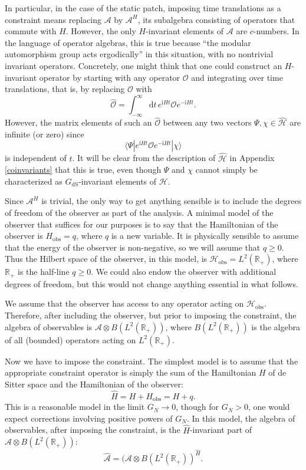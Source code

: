 \documentclass[11pt,a4paper]{article}
\def\be{\begin{equation}}
\def\ee{\end{equation}}
\def\h{\widehat}
\def\O{{\mathcal O}}
\def\A{{\mathcal A}}
\def\d{{\mathrm d}}
\def\R{{\mathbb R}}
\def\h{\widehat}
\def\H{{\mathcal H}}
\def\dS{{\mathrm{dS}}}
\def\la{\langle}
\def\ra{\rangle}
\def\obs{{\mathrm{obs}}}
\def\i{{\mathrm i}}
\begin{document}
In particular, in the case of the static patch, imposing  time translations as a constraint means replacing  $\A$ by $\A^H$, its subalgebra 
consisting of operators that commute with   $H$.    However, the only $H$-invariant elements of $\A$ are $c$-numbers.   
In the language of operator algebras, this is true because ``the modular automorphism group acts ergodically'' in this situation, with no nontrivial invariant operators.
Concretely, one 
might think that one could construct an $H$-invariant operator by starting with any operator $\O$ and integrating over time translations, that is, by replacing $\O$ with
\be\label{nbd}\h\O=\int_{-\infty}^\infty \d t \,e^{\i H t}\O e^{-\i H t}. \ee
However, the matrix elements of such an $\h\O$ between any two vectors $\Psi,\chi\in\h \H$ are infinite (or zero) since
\be\label{wnd} \la \Psi|e^{\i H t}\O e^{-\i H t}|\chi\ra\ee
is independent of $t$.    It will be clear from the description of $\h\H$ in Appendix \ref{coinvariants} that this is true, even though $\Psi$ and $\chi$ cannot
simply be characterized as $G_\dS$-invariant  elements of $\H$.

Since $\A^H$ is trivial, the only way to get anything sensible is to include the degrees of freedom of the observer as part of the analysis.   A minimal model of
the observer that suffices for our purposes is to say that the Hamiltonian of the observer is $H_\obs=q$, where $q$ is a new variable.   It is physically sensible to 
assume that the energy of the observer is non-negative, so we will assume that $q\geq 0$.   Thus the Hilbert space of the observer, in this model, is
$\H_\obs=L^2(\R_+)$, where $\R_+$ is the half-line $q\geq 0$.   We could also endow the observer with additional degrees of freedom,  but this would not change
anything essential in what follows.

We assume that the observer has access to any operator acting on $\H_\obs$.    Therefore, after including the observer, but prior to imposing the constraint, 
the algebra of observables is $\A\otimes B(L^2(\R_+))$, where $B(L^2(\R_+))$ is the algebra of all (bounded) operators acting on $L^2(\R_+)$.    

Now we have to impose the constraint.   The simplest model is to assume that the appropriate constraint operator is simply the sum of the Hamiltonian
$H$ of de Sitter space and the Hamiltonian of the observer:
\be\label{hsum}\h H =H+H_\obs=H+q. \ee
This is a reasonable model in the limit $G_N\to 0$, though for $G_N>0$, one would expect corrections involving positive powers of $G_N$.   
In this model, the algebra of observables, after imposing the constraint, is the $\h H$-invariant part of $\A\otimes B(L^2(\R_+))$:
\be\label{tsum}\h \A =(\A\otimes B(L^2(\R_+))^{\h H}. \ee
\end{document}
